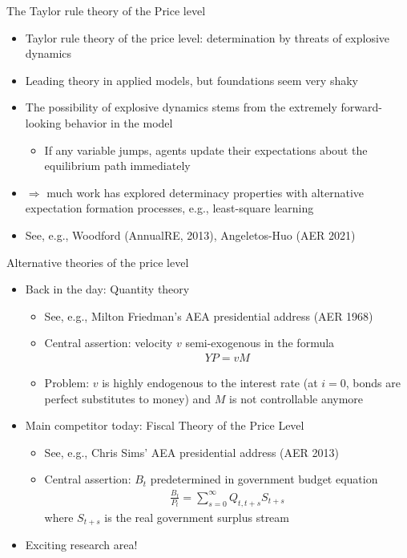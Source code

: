 \documentclass[9pt,xcolor={dvipsnames}]{beamer}
\newcommand{\bit}{\begin{itemize}}
\newcommand{\eit}{\end{itemize}}
\begin{document}
\begin{frame}{The Taylor rule theory of the Price level}

\bit
\setlength\itemsep{1.5em}
\item Taylor rule theory of the price level: determination by threats of explosive dynamics 

\item Leading theory in applied models, but foundations seem very shaky

\item The possibility of explosive dynamics stems from the extremely forward-looking behavior in the model
\bit
\item If any variable jumps, agents update their expectations about the equilibrium path immediately
\eit

\item $\Rightarrow$ much work has explored determinacy properties with alternative expectation formation processes, e.g., least-square learning

\item See, e.g., Woodford (AnnualRE, 2013), Angeletos-Huo (AER 2021)

\eit

\end{frame}

\begin{frame}{Alternative theories of the price level}

\bit
\setlength\itemsep{1em}
\item Back in the day: Quantity theory
\bit
\setlength\itemsep{0.5em}
\item See, e.g., Milton Friedman's AEA presidential address (AER 1968)

\item Central assertion: velocity $v$ semi-exogenous in the formula
\begin{eqnarray}
Y P = vM \nonumber
\end{eqnarray}

\item Problem: $v$ is highly endogenous to the interest rate (at $i=0$, bonds are perfect substitutes to money) and $M$ is not controllable anymore
\eit

\item Main competitor today: Fiscal Theory of the Price Level
\bit
\setlength\itemsep{0.5em}
\item See, e.g., Chris Sims' AEA presidential address (AER 2013)

\item Central assertion: $B_t$ predetermined in government budget equation
\begin{eqnarray}
\frac{B_t}{P_t} = \sum_{s=0}^{\infty} Q_{t,t+s} S_{t+s} \nonumber
\end{eqnarray}
where $S_{t+s}$ is the real government surplus stream

\eit

\item Exciting research area!


\eit

\end{frame}
\end{document}
